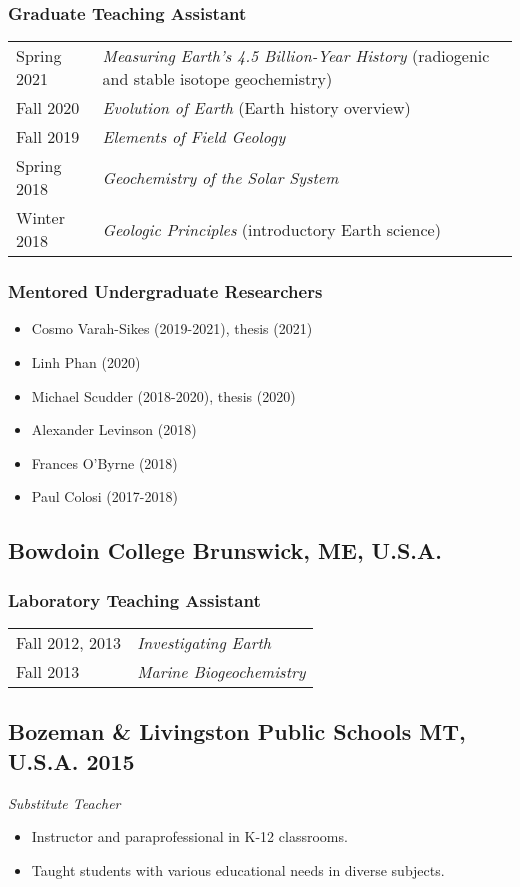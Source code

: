 \subsubsection*{Graduate Teaching Assistant} 
\begin{tabular}{p{.15\linewidth} p{.85\linewidth}} %
	Spring 2021 & \textit{Measuring Earth’s 4.5 Billion-Year History} (radiogenic and stable isotope geochemistry)\\
	Fall 2020 & \textit{Evolution of Earth} (Earth history overview) \\
	Fall 2019 & \textit{Elements of Field Geology}\\
	Spring 2018 & \textit{Geochemistry of the Solar System}\\
	Winter 2018 & \textit{Geologic Principles} (introductory Earth science)
\end{tabular}

\subsubsection*{Mentored Undergraduate Researchers}
\begin{itemize}
	\item Cosmo Varah-Sikes (2019-2021), thesis (2021)
	\item Linh Phan (2020)
	\item Michael Scudder (2018-2020), thesis (2020)
	\item Alexander Levinson (2018)
	\item Frances O'Byrne (2018)
	\item Paul Colosi (2017-2018)
\end{itemize}

\subsection*{\textbf{Bowdoin College} \hspace{15pt} Brunswick, ME, U.S.A.}
\subsubsection*{Laboratory Teaching Assistant}
\begin{tabular}{p{.15\linewidth} p{.85\linewidth}} %
Fall 2012, 2013 & \textit{Investigating Earth}\\
Fall 2013 & \textit{Marine Biogeochemistry}
\end{tabular}

\subsection*{\textbf{Bozeman \& Livingston Public Schools} \hspace{15pt} MT, U.S.A. \hfill 2015}
\textit{Substitute Teacher}
\begin{itemize}
	\item Instructor and paraprofessional in K-12 classrooms.
	\item Taught students with various educational needs in diverse subjects.
\end{itemize}